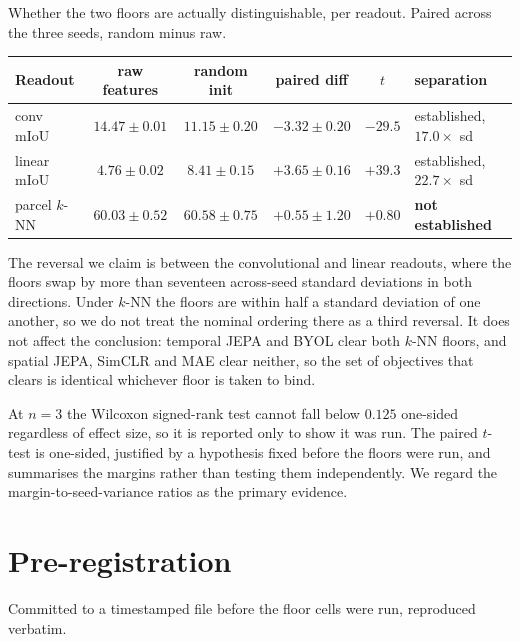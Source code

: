 \documentclass{article}
\begin{document}
Whether the two floors are actually distinguishable, per readout. Paired across the three seeds,
random minus raw.

\begin{table}[h]
  \centering
  \small
  \begin{tabular}{lccccl}
    \toprule
    Readout & raw features & random init & paired diff & $t$ & separation \\
    \midrule
    conv mIoU   & $14.47 \pm 0.01$ & $11.15 \pm 0.20$ & $-3.32 \pm 0.20$ & $-29.5$ & established, $17.0\times$ sd \\
    linear mIoU & $4.76 \pm 0.02$  & $8.41 \pm 0.15$  & $+3.65 \pm 0.16$ & $+39.3$ & established, $22.7\times$ sd \\
    parcel $k$-NN & $60.03 \pm 0.52$ & $60.58 \pm 0.75$ & $+0.55 \pm 1.20$ & $+0.80$ & \textbf{not established} \\
    \bottomrule
  \end{tabular}
\end{table}

The reversal we claim is between the convolutional and linear readouts, where the floors swap by more
than seventeen across-seed standard deviations in both directions. Under $k$-NN the floors are within
half a standard deviation of one another, so we do not treat the nominal ordering there as a third
reversal. It does not affect the conclusion: temporal JEPA and BYOL clear both $k$-NN floors, and
spatial JEPA, SimCLR and MAE clear neither, so the set of objectives that clears is identical
whichever floor is taken to bind.

At $n{=}3$ the Wilcoxon signed-rank test cannot fall below $0.125$ one-sided regardless of effect
size, so it is reported only to show it was run. The paired $t$-test is one-sided, justified by a
hypothesis fixed before the floors were run, and summarises the margins rather than testing them
independently. We regard the margin-to-seed-variance ratios as the primary evidence.

\section{Pre-registration}
\label{app:prereg}

Committed to a timestamped file before the floor cells were run, reproduced verbatim.
\end{document}
